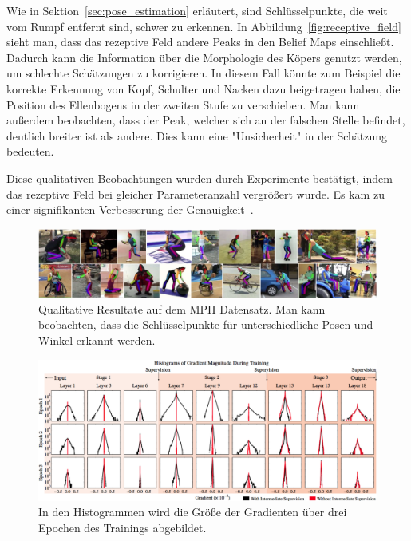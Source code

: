 \documentclass[journal, a4paper]{IEEEtran}
\begin{document}
        Wie in Sektion~\ref{sec:pose_estimation} erläutert, sind Schlüsselpunkte, die weit vom Rumpf entfernt sind, schwer zu erkennen. 
        In Abbildung~\ref{fig:receptive_field} sieht man, dass das rezeptive Feld andere Peaks in den Belief Maps einschließt. Dadurch kann die Information über die Morphologie des Köpers genutzt werden, um schlechte Schätzungen zu korrigieren. In diesem Fall könnte zum Beispiel die korrekte Erkennung von Kopf, Schulter und Nacken dazu beigetragen haben, die Position des Ellenbogens in der zweiten Stufe zu verschieben. Man kann außerdem beobachten, dass der Peak, welcher sich an der falschen Stelle befindet, deutlich breiter ist als andere. Dies kann eine "Unsicherheit" in der Schätzung bedeuten.

        Diese qualitativen Beobachtungen wurden durch Experimente bestätigt, indem das rezeptive Feld bei gleicher Parameteranzahl vergrößert wurde. Es kam zu einer signifikanten Verbesserung der Genauigkeit~\cite{conv_pose}.

\begin{figure}
        \includegraphics[width=2\columnwidth]{mpii_results.png}
        \caption{Qualitative Resultate auf dem MPII Datensatz. Man kann beobachten, dass die Schlüsselpunkte für unterschiedliche Posen und Winkel erkannt werden.}
        \label{fig:mpii_results}
\end{figure}
\begin{figure}
        \includegraphics[width=2\columnwidth]{intermediate_supervision.png}
        \caption{In den Histogrammen wird die Größe der Gradienten über drei Epochen des Trainings abgebildet.}
        \label{fig:intermediate_supervision}
\end{figure}
\end{document}
